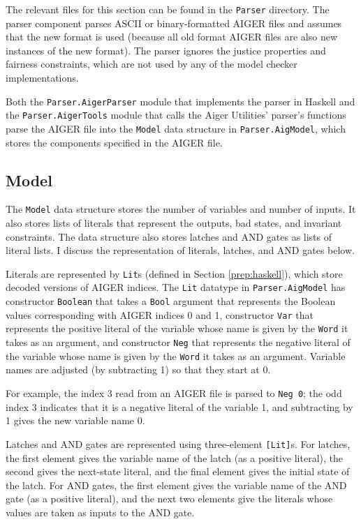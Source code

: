 \documentclass[12pt,a4paper,twoside,openright]{report}
\begin{document}
{The relevant files for this section can be found in the \verb,Parser, directory.
The parser component parses ASCII or binary-formatted AIGER files and
assumes that the new format is used (because all old format AIGER files are also
new instances of the new format). The parser ignores the
justice properties and fairness constraints, which are not used by any of the model
checker implementations.

Both the \verb,Parser.AigerParser, module that implements the parser in Haskell and
the \verb,Parser.AigerTools, module that calls the Aiger Utilities' parser's functions
parse the AIGER file into the \verb,Model, data structure in \verb,Parser.AigModel,,
which stores the components specified in the AIGER file.

\subsection{Model}

The \verb,Model, data structure stores the number of variables and
number of inputs. It also stores lists of literals that represent the outputs, bad states,
and invariant constraints. The data structure also stores latches and AND gates as
lists of literal lists. I discuss the representation of literals, latches, and
AND gates below.

Literals are represented by \verb,Lit,s (defined in Section \ref{prep:haskell}),
which store decoded versions of AIGER indices. The {\tt Lit} datatype
in {\tt Parser.AigModel} has constructor
{\tt Boolean} that takes a {\tt Bool} argument that represents the Boolean values
corresponding with AIGER indices 0 and 1, constructor {\tt Var} that represents
the positive literal of the variable whose name is given by the {\tt Word} it takes
as an argument, and constructor {\tt Neg} that represents the negative literal
of the variable whose name is given by the {\tt Word} it takes as an argument.
Variable names are adjusted (by subtracting 1) so that they start at 0.

For example, the index 3 read from an AIGER file is parsed to \verb,Neg 0,;
the odd index 3 indicates that it is a negative literal of the variable 1, and
subtracting by 1 gives the new variable name 0.

Latches and AND gates are represented using three-element \verb,[Lit],s.
For latches, the first element gives the variable name of the latch (as a positive literal),
the second gives the next-state literal, and the final element gives the initial state
of the latch. For AND gates, the first element gives the variable name of the AND gate
(as a positive literal), and the next two elements give the literals whose values are taken
as inputs to the AND gate.

}
\end{document}
